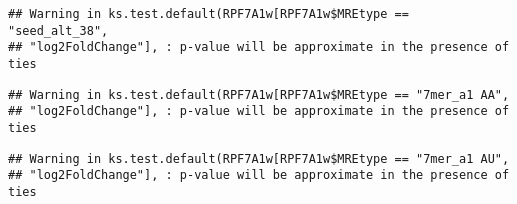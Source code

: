 \documentclass[
]{article}
\newenvironment{Shaded}{\begin{snugshade}}{\end{snugshade}}
\newcommand{\FunctionTok}[1]{\textcolor[rgb]{0.13,0.29,0.53}{\textbf{#1}}}
\newcommand{\NormalTok}[1]{#1}
\newcommand{\OtherTok}[1]{\textcolor[rgb]{0.56,0.35,0.01}{#1}}
\newcommand{\SpecialCharTok}[1]{\textcolor[rgb]{0.81,0.36,0.00}{\textbf{#1}}}
\newcommand{\StringTok}[1]{\textcolor[rgb]{0.31,0.60,0.02}{#1}}
\begin{document}
\begin{verbatim}
## Warning in ks.test.default(RPF7A1w[RPF7A1w$MREtype == "seed_alt_38",
## "log2FoldChange"], : p-value will be approximate in the presence of ties
\end{verbatim}

\begin{Shaded}
\end{Shaded}

\begin{verbatim}
## Warning in ks.test.default(RPF7A1w[RPF7A1w$MREtype == "7mer_a1 AA",
## "log2FoldChange"], : p-value will be approximate in the presence of ties
\end{verbatim}

\begin{Shaded}
\end{Shaded}

\begin{verbatim}
## Warning in ks.test.default(RPF7A1w[RPF7A1w$MREtype == "7mer_a1 AU",
## "log2FoldChange"], : p-value will be approximate in the presence of ties
\end{verbatim}
\end{document}
